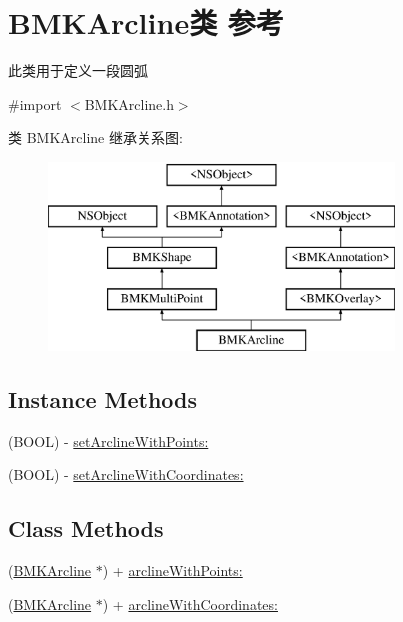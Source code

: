 \hypertarget{interface_b_m_k_arcline}{}\section{B\+M\+K\+Arcline类 参考}
\label{interface_b_m_k_arcline}


此类用于定义一段圆弧  




{\ttfamily \#import $<$B\+M\+K\+Arcline.\+h$>$}

类 B\+M\+K\+Arcline 继承关系图\+:\begin{figure}[H]
\begin{center}
\leavevmode
\includegraphics[height=5.000000cm]{interface_b_m_k_arcline}
\end{center}
\end{figure}
\subsection*{Instance Methods}
\begin{DoxyCompactItemize}
\item 
(B\+O\+O\+L) -\/ \hyperlink{interface_b_m_k_arcline_a9a7d0fa0c45543ae699def3a7099f1e8}{set\+Arcline\+With\+Points\+:}
\item 
(B\+O\+O\+L) -\/ \hyperlink{interface_b_m_k_arcline_af8435e3075a1d67f6989fd5221d98be0}{set\+Arcline\+With\+Coordinates\+:}
\end{DoxyCompactItemize}
\subsection*{Class Methods}
\begin{DoxyCompactItemize}
\item 
(\hyperlink{interface_b_m_k_arcline}{B\+M\+K\+Arcline} $\ast$) + \hyperlink{interface_b_m_k_arcline_ad439d6682d48b51c0b04e84772a38a79}{arcline\+With\+Points\+:}
\item 
(\hyperlink{interface_b_m_k_arcline}{B\+M\+K\+Arcline} $\ast$) + \hyperlink{interface_b_m_k_arcline_a34a5daa9fc480861aa52e2ef5b0ccb3a}{arcline\+With\+Coordinates\+:}
\end{DoxyCompactItemize}
